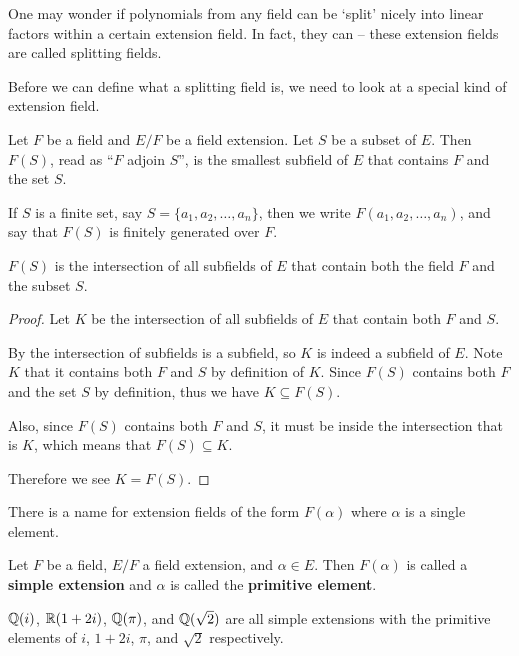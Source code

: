 One may wonder if polynomials from any field can be `split' nicely into linear factors within a certain extension field. In fact, they can -- these extension fields are called splitting fields.

Before we can define what a splitting field is, we need to look at a special kind of extension field.

\begin{definition}
    Let $F$ be a field and $E/F$ be a field extension. Let $S$ be a subset of $E$. Then $F(S)$, read as ``$F$ adjoin $S$'', is the smallest subfield of $E$ that contains $F$ and the set $S$.

    If $S$ is a finite set, say $S = \{a_1, a_2, \dots, a_n\}$, then we write $F(a_1, a_2, \dots, a_n)$, and say that $F(S)$ is finitely generated over $F$.
\end{definition}

\begin{proposition}
    $F(S)$ is the intersection of all subfields of $E$ that contain both the field $F$ and the subset $S$.
\end{proposition}
\begin{proof}
    Let $K$ be the intersection of all subfields of $E$ that contain both $F$ and $S$.

    By  the intersection of subfields is a subfield, so $K$ is indeed a subfield of $E$. Note $K$ that it contains both $F$ and $S$ by definition of $K$. Since $F(S)$ contains both $F$ and the set $S$ by definition, thus we have $K \subseteq F(S)$.

    Also, since $F(S)$ contains both $F$ and $S$, it must be inside the intersection that is $K$, which means that $F(S) \subseteq K$.

    Therefore we see $K = F(S)$.
\end{proof}

There is a name for extension fields of the form $F(\alpha)$ where $\alpha$ is a single element.

\begin{definition}
    Let $F$ be a field, $E/F$ a field extension, and $\alpha \in E$. Then $F(\alpha)$ is called a \textbf{simple extension} and $\alpha$ is called the \textbf{primitive element}.
\end{definition}

\begin{example}
    $\mathbb{Q}(i)$, $\mathbb{R}(1+2i)$, $\mathbb{Q}(\pi)$, and $\mathbb{Q}(\sqrt 2)$ are all simple extensions with the primitive elements of $i$, $1+2i$, $\pi$, and $\sqrt 2$ respectively.
\end{example}

